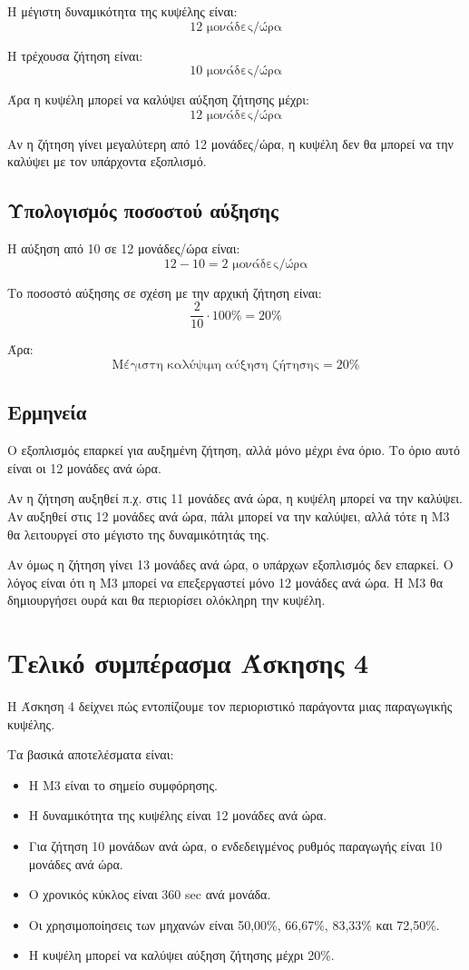 \documentclass[12pt,a4paper]{article}
\begin{document}
Η μέγιστη δυναμικότητα της κυψέλης είναι:
\[
12 \text{ μονάδες/ώρα}
\]

Η τρέχουσα ζήτηση είναι:
\[
10 \text{ μονάδες/ώρα}
\]

Άρα η κυψέλη μπορεί να καλύψει αύξηση ζήτησης μέχρι:
\[
12 \text{ μονάδες/ώρα}
\]

Αν η ζήτηση γίνει μεγαλύτερη από 12 μονάδες/ώρα, η κυψέλη δεν θα μπορεί να την καλύψει με τον υπάρχοντα εξοπλισμό.

\subsection{Υπολογισμός ποσοστού αύξησης}

Η αύξηση από 10 σε 12 μονάδες/ώρα είναι:
\[
12-10=2 \text{ μονάδες/ώρα}
\]

Το ποσοστό αύξησης σε σχέση με την αρχική ζήτηση είναι:
\[
\frac{2}{10}\cdot100\%=20\%
\]

Άρα:
\[
\boxed{\text{Μέγιστη καλύψιμη αύξηση ζήτησης}=20\%}
\]

\subsection{Ερμηνεία}

Ο εξοπλισμός επαρκεί για αυξημένη ζήτηση, αλλά μόνο μέχρι ένα όριο. Το όριο αυτό είναι οι 12 μονάδες ανά ώρα.

Αν η ζήτηση αυξηθεί π.χ. στις 11 μονάδες ανά ώρα, η κυψέλη μπορεί να την καλύψει. Αν αυξηθεί στις 12 μονάδες ανά ώρα, πάλι μπορεί να την καλύψει, αλλά τότε η Μ3 θα λειτουργεί στο μέγιστο της δυναμικότητάς της.

Αν όμως η ζήτηση γίνει 13 μονάδες ανά ώρα, ο υπάρχων εξοπλισμός δεν επαρκεί. Ο λόγος είναι ότι η Μ3 μπορεί να επεξεργαστεί μόνο 12 μονάδες ανά ώρα. Η Μ3 θα δημιουργήσει ουρά και θα περιορίσει ολόκληρη την κυψέλη.

\section{Τελικό συμπέρασμα Άσκησης 4}

Η Άσκηση 4 δείχνει πώς εντοπίζουμε τον περιοριστικό παράγοντα μιας παραγωγικής κυψέλης.

Τα βασικά αποτελέσματα είναι:

\begin{itemize}
    \item Η Μ3 είναι το σημείο συμφόρησης.
    \item Η δυναμικότητα της κυψέλης είναι 12 μονάδες ανά ώρα.
    \item Για ζήτηση 10 μονάδων ανά ώρα, ο ενδεδειγμένος ρυθμός παραγωγής είναι 10 μονάδες ανά ώρα.
    \item Ο χρονικός κύκλος είναι 360 sec ανά μονάδα.
    \item Οι χρησιμοποίησεις των μηχανών είναι 50,00\%, 66,67\%, 83,33\% και 72,50\%.
    \item Η κυψέλη μπορεί να καλύψει αύξηση ζήτησης μέχρι 20\%.
\end{itemize}
\end{document}
